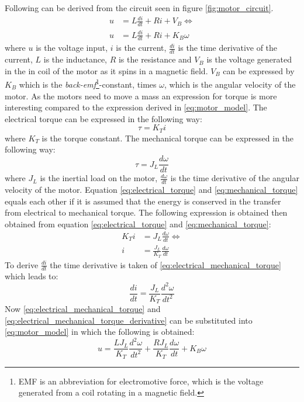 Following can be derived from the circuit seen in figure \ref{fig:motor_circuit}.
\begin{align}
	u &= L\frac{di}{dt} +  Ri + V_B \Longleftrightarrow\\
	u &= L\frac{di}{dt} +  Ri + K_B\omega\label{eq:motor_model}
\end{align}
where $u$ is the voltage input, $i$ is the current, $\frac{di}{dt}$ is the time derivative of the current, $L$ is the inductance, $R$ is the resistance and $V_B$ is the voltage generated in the in coil of the motor as it spins in a magnetic field. $V_B$ can be expressed by $K_B$ which is the \textit{back-emf}\footnote{EMF is an abbreviation for electromotive force, which is the voltage generated from a coil rotating in a magnetic field.}-constant, times $\omega$, which is the angular velocity of the motor. As the motors need to move a mass an expression for torque is more interesting compared to the expression derived in \ref{eq:motor_model}. The electrical torque can be expressed in the following way:
\begin{equation}
	\tau = K_Ti\label{eq:electrical_torque}
\end{equation}
where $K_T$ is the torque constant.	The mechanical torque can be expressed in the following way:
\begin{equation}
	\tau = J_L\frac{d\omega}{dt}\label{eq:mechanical_torque}
\end{equation}
where $J_L$ is the inertial load on the motor, $\frac{d\omega}{dt}$ is the time derivative of the angular velocity of the motor. Equation \ref{eq:electrical_torque} and \ref{eq:mechanical_torque} equals each other if it is assumed that the energy is conserved in the transfer from electrical to mechanical torque. The following expression is obtained then obtained from equation \ref{eq:electrical_torque} and \ref{eq:mechanical_torque}:
\begin{align}
	K_Ti &= J_L\frac{d\omega}{dt} \Leftrightarrow\\
	i &= \frac{J_L}{K_T} \frac{d\omega}{dt}\label{eq:electrical_mechanical_torque}
\end{align}
To derive $\frac{di}{dt}$ the time derivative is taken of \ref{eq:electrical_mechanical_torque} which leads to:
\begin{equation}
	\frac{di}{dt} = \frac{J_L}{K_T} \frac{d^{2}\omega}{dt^{2}}\label{eq:electrical_mechanical_torque_derivative}
\end{equation}
Now \ref{eq:electrical_mechanical_torque} and \ref{eq:electrical_mechanical_torque_derivative} can be substituted into \ref{eq:motor_model} in which the following is obtained:
\begin{equation}
	u = \frac{L J_L}{K_T} \frac{d^{2}\omega}{dt^{2}} + \frac{R J_L}{K_T} \frac{d\omega}{dt} + K_B \omega\label{eq:model_model}
\end{equation}

